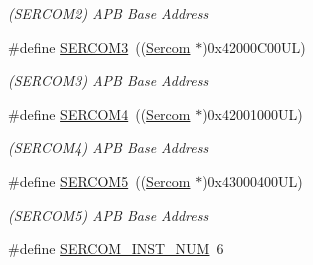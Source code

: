 \begin{DoxyCompactItemize}
\begin{DoxyCompactList}\small\item\em (S\+E\+R\+C\+O\+M2) A\+P\+B Base Address \end{DoxyCompactList}\item 
\hypertarget{group___s_a_m_l21_g18_a__base_gac9f8240be5a40b46cb09617323ebc7e3}{}\#define \hyperlink{group___s_a_m_l21_g18_a__base_gac9f8240be5a40b46cb09617323ebc7e3}{S\+E\+R\+C\+O\+M3}~((\hyperlink{union_sercom}{Sercom}   $\ast$)0x42000\+C00\+U\+L)\label{group___s_a_m_l21_g18_a__base_gac9f8240be5a40b46cb09617323ebc7e3}

\begin{DoxyCompactList}\small\item\em (S\+E\+R\+C\+O\+M3) A\+P\+B Base Address \end{DoxyCompactList}\item 
\hypertarget{group___s_a_m_l21_g18_a__base_gad48343faa88820b8f552aa1eaf66f00a}{}\#define \hyperlink{group___s_a_m_l21_g18_a__base_gad48343faa88820b8f552aa1eaf66f00a}{S\+E\+R\+C\+O\+M4}~((\hyperlink{union_sercom}{Sercom}   $\ast$)0x42001000\+U\+L)\label{group___s_a_m_l21_g18_a__base_gad48343faa88820b8f552aa1eaf66f00a}

\begin{DoxyCompactList}\small\item\em (S\+E\+R\+C\+O\+M4) A\+P\+B Base Address \end{DoxyCompactList}\item 
\hypertarget{group___s_a_m_l21_g18_a__base_ga8785a316e608cb0a218f2a59655d6037}{}\#define \hyperlink{group___s_a_m_l21_g18_a__base_ga8785a316e608cb0a218f2a59655d6037}{S\+E\+R\+C\+O\+M5}~((\hyperlink{union_sercom}{Sercom}   $\ast$)0x43000400\+U\+L)\label{group___s_a_m_l21_g18_a__base_ga8785a316e608cb0a218f2a59655d6037}

\begin{DoxyCompactList}\small\item\em (S\+E\+R\+C\+O\+M5) A\+P\+B Base Address \end{DoxyCompactList}\item 
\hypertarget{group___s_a_m_l21_g18_a__base_ga75f7d8cff25db3f1353efb6f7990fce5}{}\#define \hyperlink{group___s_a_m_l21_g18_a__base_ga75f7d8cff25db3f1353efb6f7990fce5}{S\+E\+R\+C\+O\+M\+\_\+\+I\+N\+S\+T\+\_\+\+N\+U\+M}~6\label{group___s_a_m_l21_g18_a__base_ga75f7d8cff25db3f1353efb6f7990fce5}


\end{DoxyCompactItemize}
